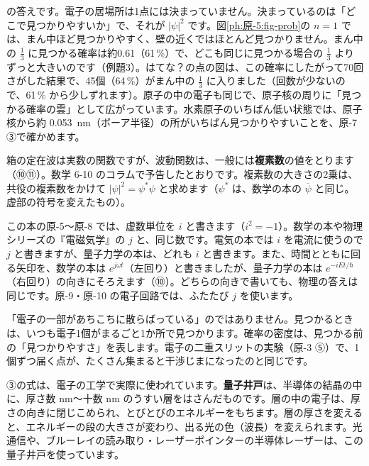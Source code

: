 \label{ph:原-5:hatena}\noindent\bkhatenaref の答えです。電子の居場所は1点には決まっていません。決まっているのは「どこで見つかりやすいか」で、それが $|\psi|^2$ です。図\ref{ph:原-5:fig-prob}の $n=1$ では、まん中ほど見つかりやすく、壁の近くではほとんど見つかりません。まん中の $\tfrac13$ に見つかる確率は約0.61（61\,\%）で、どこも同じに見つかる場合の $\tfrac13$ よりずっと大きいのです（例題3）。はてな？の点の図は、この確率にしたがって70回さがした結果で、45個（64\,\%）がまん中の $\tfrac13$ に入りました（回数が少ないので、61\,\% から少しずれます）。原子の中の電子も同じで、原子核の周りに「見つかる確率の雲」として広がっています。水素原子のいちばん低い状態では、原子核から約 \qty{0.053}{nm}（ボーア半径）の所がいちばん見つかりやすいことを、原-7 ③で確かめます。

箱の定在波は実数の関数ですが、波動関数は、一般には\textbf{複素数}の値をとります（⑩⑪）。数学 6-10 のコラムで予告したとおりです。複素数の大きさの2乗は、共役の複素数をかけて $|\psi|^2=\psi^*\psi$ と求めます（$\psi^*$ は、数学の本の $\overline{\psi}$ と同じ。虚部の符号を変えたもの）。

この本の原-5〜原-8 では、虚数単位を $i$ と書きます（$i^2=-1$）。数学の本や物理シリーズの『電磁気学』の $j$ と、同じ数です。電気の本では $i$ を電流に使うので $j$ と書きますが、量子力学の本は、どれも $i$ と書きます。また、時間とともに回る矢印を、数学の本は $e^{j\omega t}$（左回り）と書きましたが、量子力学の本は $e^{-iEt/\hbar}$（右回り）の向きにそろえます（⑩）。どちらの向きで書いても、物理の答えは同じです。原-9・原-10 の電子回路では、ふたたび $j$ を使います。

\begin{seikaku}
「電子の一部があちこちに散らばっている」のではありません。見つかるときは、いつも電子1個がまるごと1か所で見つかります。確率の密度は、見つかる前の「見つかりやすさ」を表します。電子の二重スリットの実験（原-3 ⑤）で、1個ずつ届く点が、たくさん集まると干渉じまになったのと同じです。
\end{seikaku}

\label{ph:原-5:sec5}
③の式は、電子の工学で実際に使われています。\textbf{量子井戸}は、半導体の結晶の中に、厚さ数 nm〜十数 nm のうすい層をはさんだものです。層の中の電子は、厚さの向きに閉じこめられ、とびとびのエネルギーをもちます。層の厚さを変えると、エネルギーの段の大きさが変わり、出る光の色（波長）を変えられます。光通信や、ブルーレイの読み取り・レーザーポインターの半導体レーザーは、この量子井戸を使っています。

